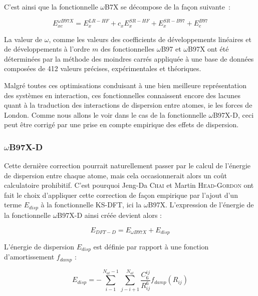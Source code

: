 C'est ainsi que la fonctionnelle $\omega$B7X\cite{chai2008long} se décompose de la façon suivante~:

\begin{equation}
E_{xc}^{\omega B97X} = E_{x}^{LR-HF} + c_{x}E_{x}^{SR-HF} + E_{x}^{SR-B97} + E_{c}^{B97}
\end{equation}

La valeur de $\omega$, comme les valeurs des coefficients de développements linéaires et de développements à l'ordre $m$ des fonctionnelles $\omega$B97 et $\omega$B97X ont été déterminées par la méthode des moindres carrés appliquée à une base de données composées de 412 valeurs précises, expérimentales et théoriques.

Malgré toutes ces optimisations conduisant à une bien meilleure représentation des systèmes en interaction, ces fonctionnelles connaissent encore des lacunes quant à la traduction des interactions de dispersion entre atomes, ie les forces de London. Comme nous allons le voir dans le cas de la fonctionnelle $\omega$B97X-D, ceci peut être corrigé par une prise en compte empirique des effets de dispersion.

\subsubsection{$\omega$B97X-D}

Cette dernière correction pourrait naturellement passer par le calcul de l'énergie de dispersion entre chaque atome, mais cela occasionnerait alors un coût calculatoire prohibitif. C'est pourquoi Jeng-Da \textsc{Chai} et Martin \textsc{Head-Gordon} ont fait le choix d'appliquer cette correction de façon empirique par l'ajout d'un terme $E_{disp}$ à la fonctionnelle KS-DFT, ici la $\omega$B97X. L'expression de l'énergie de la fonctionnelle $\omega$B97X-D \cite{chai2008long} ainsi créée devient alors :

\begin{equation}
E_{DFT-D}=E_{\omega B97X}+E_{disp}
\end{equation}

L'énergie de dispersion $E_{disp}$ est définie par rapport à une fonction d'amortissement $f_{damp}$ :

\begin{equation}
E_{disp}=-\sum_{i-1}^{N_{at}-1} \sum_{j-i+1}^{N_{at}} \frac{C_{6}^{ij}}{R_{ij}^{6}}f_{damp} (R_{ij})
\end{equation}

